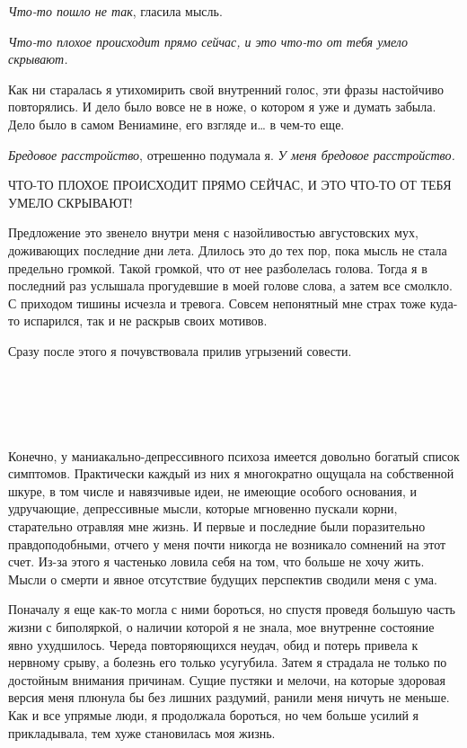 \documentclass[
]{book}
\begin{document}
\emph{Что-то пошло не так}, гласила мысль.

\emph{Что-то плохое происходит прямо сейчас, и это что-то от тебя умело скрывают.}

Как ни старалась я утихомирить свой внутренний голос, эти фразы настойчиво повторялись. И дело было вовсе не в ноже, о котором я уже и думать забыла. Дело было в самом Вениамине, его взгляде и\ldots{} в чем-то еще.

\emph{Бредовое расстройство}, отрешенно подумала я. \emph{У меня бредовое расстройство.}

ЧТО-ТО ПЛОХОЕ ПРОИСХОДИТ ПРЯМО СЕЙЧАС, И ЭТО ЧТО-ТО ОТ ТЕБЯ УМЕЛО СКРЫВАЮТ!

Предложение это звенело внутри меня с назойливостью августовских мух, доживающих последние дни лета. Длилось это до тех пор, пока мысль не стала предельно громкой. Такой громкой, что от нее разболелась голова. Тогда я в последний раз услышала прогудевшие в моей голове слова, а затем все смолкло. С приходом тишины исчезла и тревога. Совсем непонятный мне страх тоже куда-то испарился, так и не раскрыв своих мотивов.

Сразу после этого я почувствовала прилив угрызений совести.

\hypertarget{chapter-37}{%
\chapter{~}\label{chapter-37}}

Конечно, у маниакально-депрессивного психоза имеется довольно богатый список симптомов. Практически каждый из них я многократно ощущала на собственной шкуре, в том числе и навязчивые идеи, не имеющие особого основания, и удручающие, депрессивные мысли, которые мгновенно пускали корни, старательно отравляя мне жизнь. И первые и последние были поразительно правдоподобными, отчего у меня почти никогда не возникало сомнений на этот счет. Из-за этого я частенько ловила себя на том, что больше не хочу жить. Мысли о смерти и явное отсутствие будущих перспектив сводили меня с ума.

Поначалу я еще как-то могла с ними бороться, но спустя проведя большую часть жизни с биполяркой, о наличии которой я не знала, мое внутренне состояние явно ухудшилось. Череда повторяющихся неудач, обид и потерь привела к нервному срыву, а болезнь его только усугубила. Затем я страдала не только по достойным внимания причинам. Сущие пустяки и мелочи, на которые здоровая версия меня плюнула бы без лишних раздумий, ранили меня ничуть не меньше. Как и все упрямые люди, я продолжала бороться, но чем больше усилий я прикладывала, тем хуже становилась моя жизнь.
\end{document}
